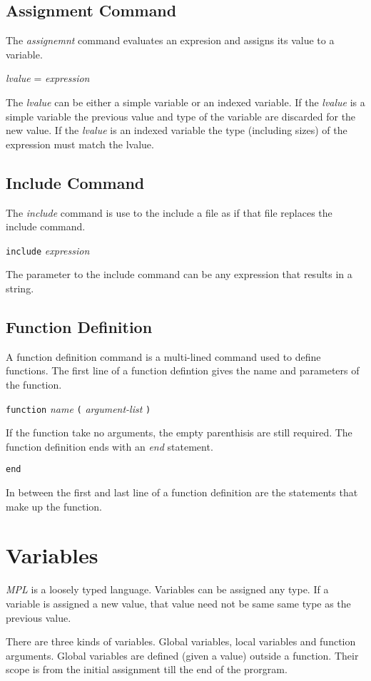 \documentclass{article}
\begin{document}
\subsection{Assignment Command}
The \emph{assignemnt} command evaluates an expresion and
assigns its value to a variable.
\begin{center}
  \emph{lvalue} = \emph{expression}
\end{center}
The \emph{lvalue} can be either a simple variable or an indexed variable.
If the \emph{lvalue} is a simple variable the previous value and
type of the variable are discarded for the new value.
If the \emph{lvalue} is an indexed variable the type (including sizes)
of the expression must match the lvalue.
\subsection{Include Command}
The \emph{include} command is use to the include a file as if
that file replaces the include command.
\begin{center}
  \verb|include| \emph{expression}
\end{center}
The parameter to the include command can be any expression that results in a string.
\subsection{Function Definition}
A function definition command is a multi-lined command used to define functions.
The first line of a function defintion gives the name and parameters of the function.
\begin{center}
  \verb|function| \emph{name} \verb|(| \emph{argument-list} \verb|)|
\end{center}
If the function take no arguments, the empty parenthisis are still required.
The function definition ends with an \emph{end} statement.
\begin{center}
  \verb|end|
\end{center}
In between the first and last line of a function definition are the statements that make up the function.
\section{Variables}
\emph{MPL} is a loosely typed language.
Variables can be assigned any type.
If a variable is assigned a new value, that value need not be same
same type as the previous value.

There are three kinds of variables. Global variables, local variables and function arguments.
Global variables are defined (given a value) outside a function.
Their scope is from the initial assignment till the end of the prorgram.
\end{document}
